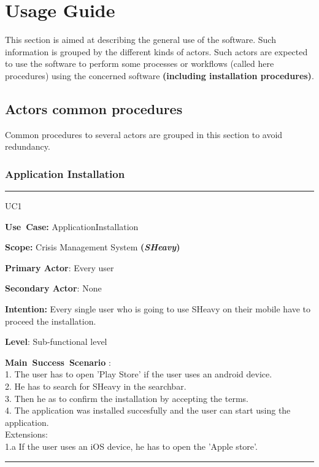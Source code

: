 \chapter{Usage Guide}
\label{chap:usage_guide}

This section is aimed at describing the general use of the software. Such
information is grouped by the different kinds of actors.
Such actors are expected to use the software to perform some
processes or workflows (called here procedures) using the concerned software
\textbf{(including installation procedures)}.

\section{Actors common procedures}
Common procedures to several actors are grouped in this section to avoid
redundancy.

\subsection{Application Installation}
\vspace{0.5cm} 
\hrule
\vspace{0.5cm}
\begin{lyxlist}{UC1}
\small{
\item [\textbf{Use~Case:}] ApplicationInstallation
\item [\textbf{Scope:}] Crisis Management System \textbf{(\emph{SHeavy})}
\item [\textbf{Primary Actor}:] Every user
\item [\textbf{Secondary Actor}:] None
\item [\textbf{Intention:}] Every single user who is going to use SHeavy on
their mobile have to proceed the installation.
\item [\textbf{Level}:]Sub-functional level
\item [\textbf{Main~Success~Scenario}]:\\
1. The user has to open 'Play Store' if the user uses an android device.\\
2. He has to search for SHeavy in the searchbar.\\
3. Then he as to confirm the installation by accepting the terms.\\
4. The application was installed succesfully and the user can start using the
application.\\
Extensions:\\
	1.a If the user uses an iOS device, he has to open the 'Apple store'.\\
}
\end{lyxlist}
\hrule 
\vspace{0.5cm}

